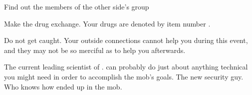 \documentclass[blue]{guildcamp3}
\begin{document}
\begin{itemz}[Goals]
	\item Find out the members of the other side's group
	\item Make the drug exchange. Your drugs are denoted by item number \iDrugsTech{}.
	\item Do not get caught. Your outside connections cannot help you during this event, and they may not be so merciful as to help you afterwards.
\end{itemz}

\begin{members}
	\member{\cSciOne{\intro}} The current leading scientist of \bTechWorld{}. \cSciOne{\They} can probably do just about anything technical you might need in order to accomplish the mob's goals. 
	\member{\cSpecOpTwo{\intro}} The new security guy. Who knows how \cSpecOpTwo{\they} ended up in the mob.

\end{members}
\end{document}
